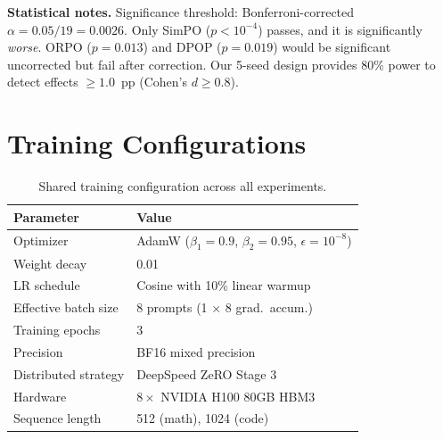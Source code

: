 \documentclass{article}
\begin{document}
\textbf{Statistical notes.} Significance threshold: Bonferroni-corrected $\alpha = 0.05/19 = 0.0026$. Only SimPO ($p < 10^{-4}$) passes, and it is significantly \emph{worse}. ORPO ($p = 0.013$) and DPOP ($p = 0.019$) would be significant uncorrected but fail after correction. Our 5-seed design provides 80\% power to detect effects $\geq 1.0$~pp (Cohen's $d \geq 0.8$).

\section{Training Configurations}
\label{app:configs}

\begin{table}[ht]
\centering
\caption{Shared training configuration across all experiments.}
\small
\begin{tabular}{@{}ll@{}}
\toprule
\textbf{Parameter} & \textbf{Value} \\
\midrule
Optimizer & AdamW ($\beta_1\!=\!0.9$, $\beta_2\!=\!0.95$, $\epsilon\!=\!10^{-8}$) \\
Weight decay & 0.01 \\
LR schedule & Cosine with 10\% linear warmup \\
Effective batch size & 8 prompts (1 $\times$ 8 grad.\ accum.) \\
Training epochs & 3 \\
Precision & BF16 mixed precision \\
Distributed strategy & DeepSpeed ZeRO Stage 3 \\
Hardware & $8\times$ NVIDIA H100 80GB HBM3 \\
Sequence length & 512 (math), 1024 (code) \\
\bottomrule
\end{tabular}
\end{table}
\end{document}
